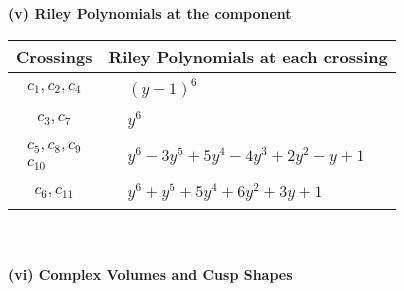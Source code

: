 \documentclass[1p]{elsarticle_modified}
\theoremstyle{definition}
\begin{document}
\newpage\renewcommand{\arraystretch}{1}
\flushleft \textbf{(v) Riley Polynomials at the component}\newline \\
\begin{tabular}{m{50pt}|m{274pt}}
Crossings & \hspace{64pt}Riley Polynomials at each crossing \\
\hline $$\begin{aligned}c_{1},c_{2},c_{4}\end{aligned}$$&$\begin{aligned}
&(y-1)^6
\end{aligned}$\\
\hline $$\begin{aligned}c_{3},c_{7}\end{aligned}$$&$\begin{aligned}
&y^6
\end{aligned}$\\
\hline $$\begin{aligned}c_{5},c_{8},c_{9}\\c_{10}\end{aligned}$$&$\begin{aligned}
&y^6-3 y^5+5 y^4-4 y^3+2 y^2- y+1
\end{aligned}$\\
\hline $$\begin{aligned}c_{6},c_{11}\end{aligned}$$&$\begin{aligned}
&y^6+y^5+5 y^4+6 y^2+3 y+1
\end{aligned}$\\
\hline
\end{tabular}\\~\\
\newpage\flushleft \textbf{(vi) Complex Volumes and Cusp Shapes}
\end{document}
